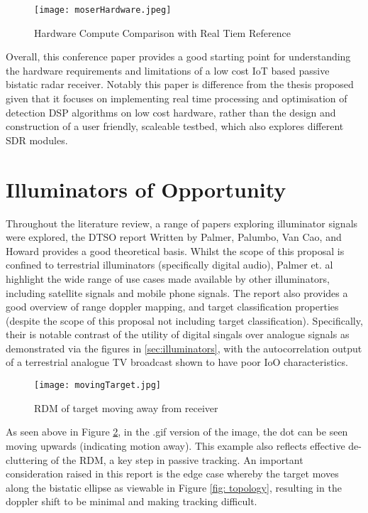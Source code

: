 \begin{figure}[htbp]
    \centering
    \texttt{[image: moserHardware.jpeg]}
    \caption{Hardware Compute Comparison with Real Tiem Reference \cite{IOTpassiveRadar}}
    \label{fig:iotCompute}
\end{figure}

Overall, this conference paper provides a good starting point for understanding the hardware requirements and limitations of a low cost IoT based passive bistatic radar receiver. Notably this paper is difference from the thesis proposed given that it focuses on implementing real time processing and optimisation of detection DSP algorithms on low cost hardware, rather than the design and construction of a user friendly, scaleable testbed, which also explores different SDR modules.

\section{Illuminators of Opportunity}

Throughout the literature review, a range of papers exploring illuminator signals were explored, the DTSO report Written by Palmer, Palumbo, Van Cao, and Howard provides a good theoretical basis. Whilst the scope of this proposal is confined to terrestrial illuminators (specifically digital audio), Palmer et. al highlight the wide range of use cases made available by other illuminators, including satellite signals and mobile phone signals. The report also provides a good overview of range doppler mapping, and target classification properties (despite the scope of this proposal not including target classification). Specifically, their is notable contrast of the utility of digital singals over analogue signals as demonstrated via the figures in \ref{sec:illuminators}, with the autocorrelation output of a terrestrial analogue TV broadcast shown to have poor IoO characteristics.

\begin{figure}[htbp]
    \centering
    \texttt{[image: movingTarget.jpg]}
    \caption{RDM of target moving away from receiver \cite{DTSO2009}}
    \label{fig:rdm}
\end{figure}

\noindent As seen above in Figure \ref{fig:rdm}, in the .gif version of the image, the dot can be seen moving upwards (indicating motion away). This example also reflects effective de-cluttering of the RDM, a key step in passive tracking. An important consideration raised in this report is the edge case whereby the target moves along the bistatic ellipse as viewable in Figure \ref{fig: topology}, resulting in the doppler shift to be minimal and making tracking difficult.

